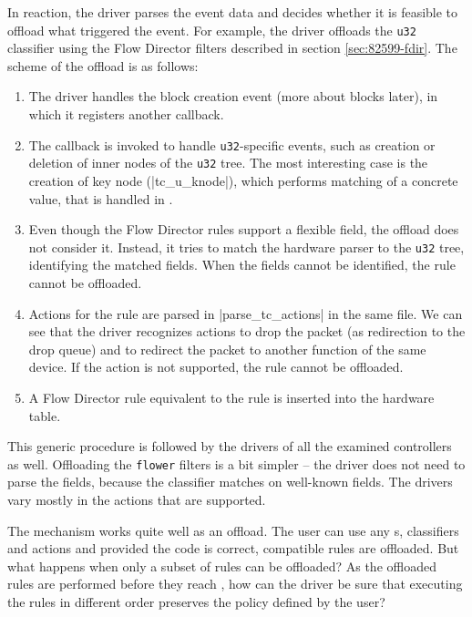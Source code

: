 In reaction, the driver parses the event data and decides whether it is feasible to
offload what triggered the event. For example, the  driver offloads the
\texttt{u32} classifier using the Flow Director filters described in section
\ref{sec:82599-fdir}. The scheme of the offload is as follows:

\begin{enumerate}
	\item The driver handles the block creation event (more about blocks
		later), in which it registers another callback.

	\item The callback is invoked to handle \texttt{u32}-specific events, such
		as creation or deletion of inner nodes of the \texttt{u32} tree. The
		most interesting case is the creation of key node (\struct|tc_u_knode|),
		which performs matching of a concrete value, that is handled in
		.

	\item Even though the Flow Director rules support a flexible field, the
		offload does not consider it. Instead, it tries to match the hardware parser to
		the \texttt{u32} tree, identifying the matched fields. When the fields
		cannot be identified, the rule cannot be offloaded.

	\item Actions for the rule are parsed in \fnc|parse_tc_actions| in
		the same file. We can see that the driver recognizes actions to drop
		the packet (as redirection to the drop queue) and to redirect the
		packet to another function of the same device. If the action is not
		supported, the rule cannot be offloaded.

	\item A Flow Director rule equivalent to the  rule is inserted into
		the hardware table.
\end{enumerate}

This generic procedure is followed by the drivers of all the examined controllers
as well. Offloading the \texttt{flower} filters is a bit simpler -- the driver does not
need to parse the fields, because the classifier matches on well-known fields.
The drivers vary mostly in the actions that are supported.

The mechanism works quite well as an offload. The user can use any \qdisc{}s,
classifiers and actions and provided the code is correct, compatible rules
are offloaded. But what happens when only a subset of rules can be offloaded?
As the offloaded rules are performed before they reach , how can the driver
be sure that executing the rules in different order preserves the policy
defined by the user?

